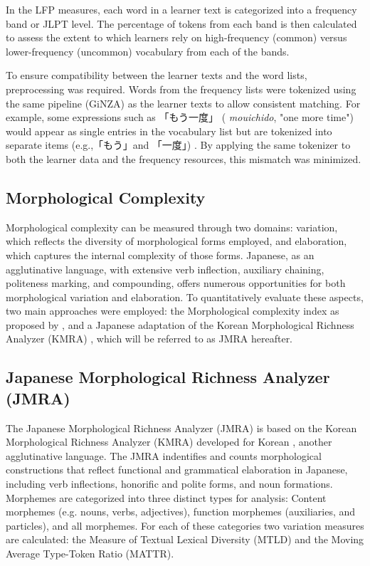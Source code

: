 In the LFP measures, each word in a learner text is categorized into a frequency band or JLPT level. The percentage of
tokens
from each band is then calculated to assess the extent to which learners rely on high-frequency (common) versus
lower-frequency (uncommon) vocabulary from
each of the bands.

To ensure compatibility between the learner texts and the word lists, preprocessing was required. Words from the
frequency lists were tokenized using the same pipeline (GiNZA) as the learner texts to allow consistent matching.
 For example, some expressions such as
「もう一度」 (
\textit{mouichido}, "one more time") would appear as single entries in the vocabulary list but are tokenized
into separate
items (e.g.,「もう」and 「一度」) . By applying the same tokenizer to both the learner data and the frequency resources, this
mismatch was minimized.


\subsection{Morphological Complexity}
Morphological complexity can be measured through two domains: variation, which reflects the diversity of morphological
forms employed, and
elaboration, which captures the internal complexity of those forms. Japanese, as an
agglutinative
language, with extensive verb inflection, auxiliary chaining, politeness marking, and compounding,
offers
numerous opportunities for both morphological variation and elaboration. To quantitatively evaluate these aspects, two
main
approaches were employed: the Morphological complexity index as proposed by
\citet{Brezina2019}, and a Japanese adaptation of the Korean Morphological Richness Analyzer (KMRA) \citet{Hwang2024}, which will be
referred to as
JMRA hereafter.


\subsection{Japanese Morphological Richness Analyzer (JMRA)}

The Japanese Morphological Richness Analyzer (JMRA) is based on the Korean Morphological Richness Analyzer (KMRA)
developed for Korean \citep{Hwang2024}, another
agglutinative language. The JMRA indentifies and counts morphological constructions that reflect
functional and grammatical elaboration in Japanese, including verb inflections, honorific and polite forms, and noun
formations.
Morphemes
are categorized into three distinct types for analysis: Content morphemes (e.g. nouns, verbs, adjectives),
function
morphemes (auxiliaries, and particles), and all morphemes. For each of these categories two variation measures are
calculated: the
Measure of Textual Lexical Diversity (MTLD) and the Moving Average Type-Token Ratio (MATTR).

